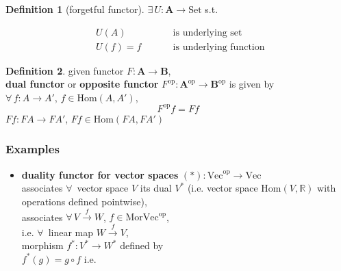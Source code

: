 \documentclass[twoside,landscape,10pt]{amsart}
\theoremstyle{plain}
\theoremstyle{definition}
\newtheorem{definition}{Definition}
\theoremstyle{remark}
\begin{document}
\begin{multicols*}{2}
\begin{definition}[forgetful functor]
$\exists \, U : \mathbf{A} \to \text{Set}$ s.t. 

\[
\begin{aligned}
  & U(A) \qquad \, & \text{ is underlying set } \\ 
    & U(f) =f \qquad \, & \text{ is underlying function } 
\end{aligned}
\]


\end{definition}


\begin{definition}
  given functor $F: \mathbf{A} \to \mathbf{B}$, \\
\textbf{dual functor} or \textbf{opposite functor} $F^{\text{op}} : \mathbf{A}^{\text{op}} \to \mathbf{B}^{\text{op}}$ is given by  \\
$\forall \, f : A \to A'$, $f\in \text{Hom}(A,A')$, 
\[
F^{\text{op}}f = Ff 
\]
$Ff : FA \to FA'$, $Ff \in \text{Hom}(FA,FA')$
\end{definition}



\subsubsection{Examples}

\begin{itemize}
  \item \textbf{duality functor for vector spaces } $(*) : \text{Vec}^{\text{op}} \to \text{Vec}$ \\
associates $\forall \, $ vector space $V$ its dual $V^*$ (i.e. vector space $\text{Hom}(V,\mathbb{R})$ with operations defined pointwise), \\
associates $\forall \, V\xrightarrow{f}W$, $f\in \text{Mor}\text{Vec}^{\text{op}}$, \\
i.e. $\forall \, $ linear map $W \xrightarrow{f} V$, \\
morphism $f^*:V^* \to W^*$ defined by \\
\phantom{morphism} $f^*(g) = g\circ f$ i.e. 





\end{itemize}
\end{multicols*}
\end{document}
